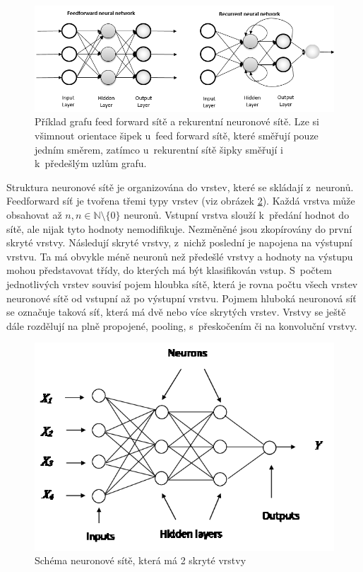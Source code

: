 \begin{figure}[H]
    \centering
    \includegraphics[scale=0.5]{obrazky-figures/feedforward_vs_recurrent.png}
    \caption{\label{fig:netcomparison}Příklad grafu feed forward sítě a rekurentní neuronové sítě. Lze si všimnout orientace šipek u~feed forward sítě, které směřují pouze jedním směrem, zatímco u~rekurentní sítě šipky směřují i k~předešlým uzlům grafu.}
\end{figure}

Struktura neuronové sítě je organizována do vrstev, které se skládají z~neuronů. Feedforward síť je tvořena třemi typy vrstev (viz obrázek \ref{fig:mlp}). Každá vrstva může obsahovat až $n, n \in \mathbb{N}\setminus\{0\}$ neuronů. Vstupní vrstva slouží k~předání hodnot do sítě, ale nijak tyto hodnoty nemodifikuje. Nezměněné jsou zkopírovány do první skryté vrstvy. Následují skryté vrstvy, z~nichž poslední je napojena na výstupní vrstvu. Ta má obvykle méně neuronů než předešlé vrstvy a hodnoty na výstupu mohou představovat třídy, do kterých má být klasifikován vstup. S~počtem jednotlivých vrstev souvisí pojem hloubka sítě, která je rovna počtu všech vrstev neuronové sítě od vstupní až po výstupní vrstvu. Pojmem hluboká neuronová síť se označuje taková síť, která má dvě nebo více skrytých vrstev. Vrstvy se ještě dále rozdělují na plně propojené, pooling, s~přeskočením či na konvoluční vrstvy.

\begin{figure}[H]
    \centering
    \includegraphics[scale=1.3]{obrazky-figures/mlp.png}
    \caption{\label{fig:mlp}Schéma neuronové sítě, která má 2 skryté vrstvy}
\end{figure}



